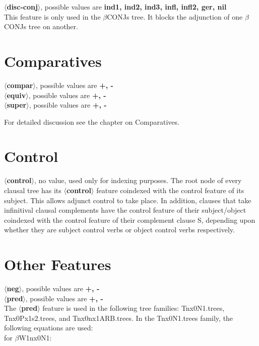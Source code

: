 {\bf $\langle$disc-conj$\rangle$}, possible values are {\bf ind1, ind2, ind3, infl, infl2, ger, nil}\\
This feature is only used in the $\beta$CONJs tree.
It blocks the adjunction of one $\beta$CONJs tree on another.

\section{Comparatives}
{\bf $\langle$compar$\rangle$}, possible values are {\bf +, -}\\
{\bf $\langle$equiv$\rangle$}, possible values are {\bf +, -}\\
{\bf $\langle$super$\rangle$}, possible values are {\bf +, -}

For detailed discussion see the chapter on Comparatives.

\section{Control}
{\bf $\langle$control$\rangle$}, no value, used only for indexing purposes.
The root node of every clausal tree has its {\bf $\langle$control$\rangle$}
feature coindexed with the control feature of its subject. 
This allows adjunct control to take place. In addition, clauses
that take infinitival clausal complements have the control
feature of their subject/object coindexed with the control feature
of their complement clause S, depending upon whether they are
subject control verbs or object control verbs respectively.


\section{Other Features}
{\bf $\langle$neg$\rangle$}, possible values are {\bf +, -}\\

{\bf $\langle$pred$\rangle$}, possible values are {\bf +, -}\\
The {\bf $\langle$pred$\rangle$} feature is used in the following tree
families: Tnx0N1.trees, Tnx0Px1s2.trees, and Tnx0nx1ARB.trees.
In the Tnx0N1.trees family, the following equations are used:\\
for $\beta$W1nx0N1:


